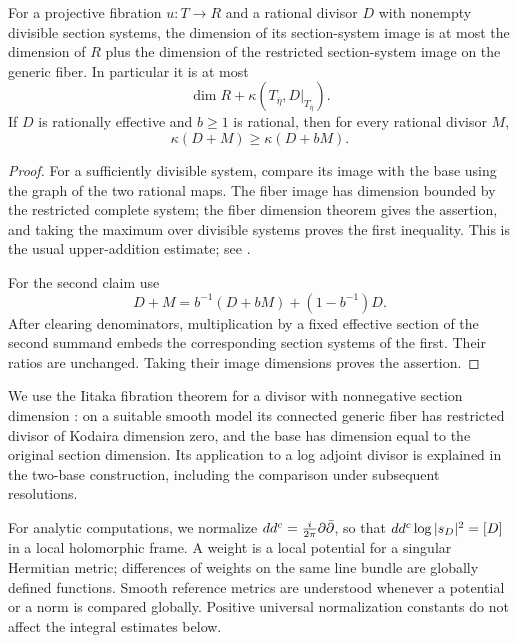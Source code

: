 \begin{lemma}\label{prelim:addition}
For a projective fibration \(u:T\to R\) and a rational divisor \(D\) with nonempty divisible section systems, the dimension of its section-system image is at most the dimension of \(R\) plus the dimension of the restricted section-system image on the generic fiber. In particular it is at most
\[
\dim R+\kappa(T_{\overline\eta},D|_{T_{\overline\eta}}).
\]
If \(D\) is rationally effective and \(b\geq1\) is rational, then for every rational divisor \(M\),
\[
\kappa(D+M)\geq\kappa(D+bM).
\]
\end{lemma}

\begin{proof}
For a sufficiently divisible system, compare its image with the base using the graph of the two rational maps. The fiber image has dimension bounded by the restricted complete system; the fiber dimension theorem gives the assertion, and taking the maximum over divisible systems proves the first inequality. This is the usual upper-addition estimate; see \cite[Theorem~4, p.~357]{IitakaOriginal}.

For the second claim use
\[
D+M=b^{-1}(D+bM)+(1-b^{-1})D.
\]
After clearing denominators, multiplication by a fixed effective section of the second summand embeds the corresponding section systems of the first. Their ratios are unchanged. Taking their image dimensions proves the assertion.
\end{proof}

We use the Iitaka fibration theorem for a divisor with nonnegative section dimension \cite[Theorems~3--4]{IitakaOriginal}: on a suitable smooth model its connected generic fiber has restricted divisor of Kodaira dimension zero, and the base has dimension equal to the original section dimension. Its application to a log adjoint divisor is explained in the two-base construction, including the comparison under subsequent resolutions.

For analytic computations, we normalize
\(dd^c=\frac{i}{2\pi}\partial\bar\partial\), so that
\(dd^c\log|s_D|^2=[D]\) in a local holomorphic frame. A weight is a local potential for a singular Hermitian metric; differences of weights on the same line bundle are globally defined functions. Smooth reference metrics are understood whenever a potential or a norm is compared globally. Positive universal normalization constants do not affect the integral estimates below.




